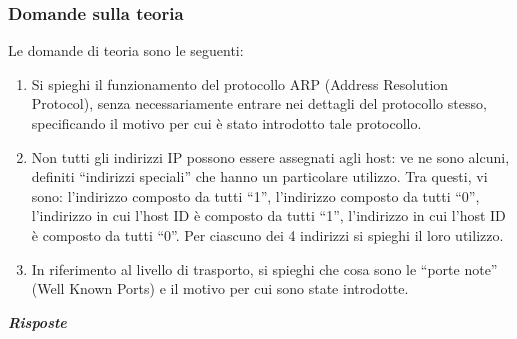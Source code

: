 \documentclass[a4paper]{article}
\newcommand{\dquotes}[1]{``#1''}
\begin{document}
	\subsubsection{Domande sulla teoria}
	Le domande di teoria sono le seguenti:
	\begin{enumerate}
		\item Si spieghi il funzionamento del protocollo ARP (Address Resolution Protocol), senza necessariamente entrare nei dettagli del protocollo stesso, specificando il motivo per cui è stato introdotto tale protocollo.
		
		\item Non tutti gli indirizzi IP possono essere assegnati agli host: ve ne sono alcuni, definiti \dquotes{indirizzi speciali} che hanno un particolare utilizzo. Tra questi, vi sono: l'indirizzo composto da tutti \dquotes{1}, l'indirizzo composto da tutti \dquotes{0}, l'indirizzo in cui l'host ID è composto da tutti \dquotes{1}, l'indirizzo in cui l'host ID è composto da tutti \dquotes{0}. Per ciascuno dei 4 indirizzi si spieghi il loro utilizzo.
		
		\item In riferimento al livello di trasporto, si spieghi che cosa sono le \dquotes{porte note} (Well Known Ports) e il motivo per cui sono state introdotte.
	\end{enumerate}
	\textcolor{Green4}{\textbf{\emph{Risposte}}}
\end{document}
